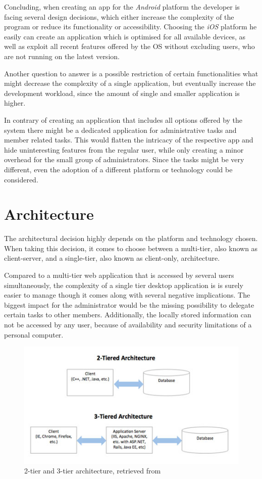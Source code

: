 Concluding, when creating an app for the \emph{Android} platform the developer is facing several design decisions, which either increase the complexity of the program or reduce its functionality or accessibility. Choosing the \emph{iOS} platform he easily can create an application which is optimised for all available devices, as well as exploit all recent features offered by the \gls{OS} without excluding users, who are not running on the latest version. 

Another question to answer is a possible restriction of certain functionalities what might decrease the complexity of a single application, but eventually increase the development workload, since the amount of single and smaller application is higher. 

In contrary of creating an application that includes all options offered by the system there might be a dedicated application for administrative tasks and member related tasks. This would flatten the intricacy of the respective app and hide uninteresting features from the regular user, while only creating a minor overhead for the small group of administrators. Since the tasks might be very different, even the adoption of a different platform or technology could be considered. 

\section{Architecture} %
\label{sec:Architecture}
The architectural decision highly depends on the platform and technology chosen. When taking this decision, it comes to choose between a multi-tier, also known as client-server, and a single-tier, also known as client-only, architecture.

Compared to a multi-tier web application that is accessed by several users simultaneously, the complexity of a single tier desktop application is is surely easier to manage though it comes along with several negative implications. The biggest impact for the administrator would be the missing possibility to delegate certain tasks to other members. Additionally, the locally stored information can not be accessed by any user, because of availability and security limitations of a personal computer.

\begin{figure}[h]
  	\centering
  	\includegraphics[width=0.7\linewidth]{./images/tier-architecture.jpg}
  	\caption{2-tier and 3-tier architecture, retrieved from \cite{Wright:2015aa}}
	\label{fig:TierArchitecture}
\end{figure}
\nocite{Wright:2015aa}

